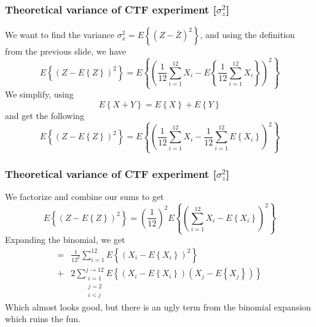 \documentclass[compress]{beamer}
\newcommand{\E}[1]{\ensuremath{E\left\{#1\right\}}}
\begin{document}
\begin{frame}
    \frametitle{Theoretical variance of CTF experiment [$\sigma_z^2$]}
    We want to find the variance $\sigma_x^2 = \E{(Z-\bar{Z})^2}$, and using 
    the definition from the previous slide, we have
    \begin{equation*}
        \E{(Z-\E{Z})^2}=\E{\left(\frac{1}{12}\sum^{12}_{i=1}{X_i} -
        \E{\frac{1}{12}\sum^{12}_{i=1}{X_i}}\right)^2}
    \end{equation*}
    We simplify, using
    \begin{equation}
        \E{X+Y} = \E{X} + \E{Y}
    \end{equation}
    and get the following
    \begin{equation*}
        \E{(Z-\E{Z})^2}=\E{\left(\frac{1}{12}\sum^{12}_{i=1}{X_i} 
                - \frac{1}{12}
        \sum^{12}_{i=1}{\E{X_i}}\right)^2}
    \end{equation*}
\end{frame}
\begin{frame}
    \frametitle{Theoretical variance of CTF experiment [$\sigma_z^2$]}
    We factorize and combine our sums to get
    \begin{equation*}
        \E{(Z-\E{Z})^2} = \left(\frac{1}{12}\right)^2
        \E{\left(\sum^{12}_{i=1}{X_i - \E{X_i}}\right)^2}
    \end{equation*}
    Expanding the binomial, we get
    \begin{align*}
        = & \frac{1}{12^2}\sum^{12}_{i=1}{\E{\left(X_i - \E{X_i}\right)^2}} \\
        + & 2 \sum^{j\rightarrow12}_{\substack{i=1\\j=2\\i<j}}
        {\E{(X_i - \E{X_i})(X_j - \E{X_j})}}
    \end{align*}
    Which almost looks good, but there is an ugly term from the binomial
    expansion which ruins the fun.
\end{frame}
\end{document}
